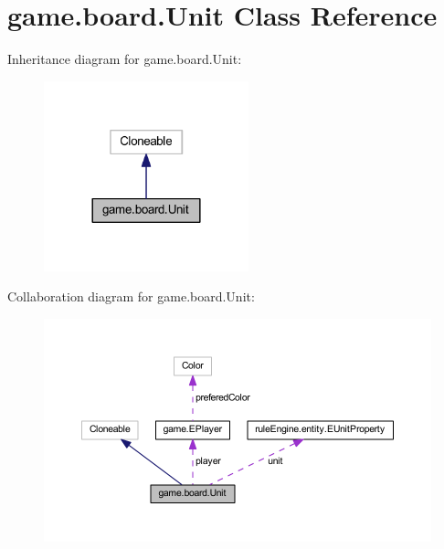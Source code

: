 \hypertarget{classgame_1_1board_1_1_unit}{}\section{game.\+board.\+Unit Class Reference}
\label{classgame_1_1board_1_1_unit}


Inheritance diagram for game.\+board.\+Unit\+:
\nopagebreak
\begin{figure}[H]
\begin{center}
\leavevmode
\includegraphics[width=168pt]{classgame_1_1board_1_1_unit__inherit__graph}
\end{center}
\end{figure}


Collaboration diagram for game.\+board.\+Unit\+:
\nopagebreak
\begin{figure}[H]
\begin{center}
\leavevmode
\includegraphics[width=350pt]{classgame_1_1board_1_1_unit__coll__graph}
\end{center}
\end{figure}
